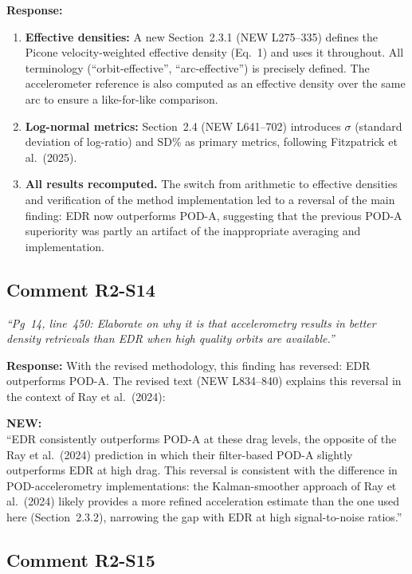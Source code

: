 \documentclass[11pt]{article}
\newcommand{\reviewercomment}[1]{%
  \medskip
  \noindent\textit{\color{reviewblue}#1}%
  \medskip
}
\newcommand{\newtext}[1]{%
  \smallskip
  \noindent\hspace{1em}\begin{minipage}{0.92\textwidth}%
  \color{quotegreen}\textbf{NEW:}\\[2pt]``#1''%
  \end{minipage}%
  \smallskip
}
\begin{document}
\textbf{Response:}

\begin{enumerate}[nosep]
  \item \textbf{Effective densities:} A new Section~2.3.1 (NEW L275--335) defines the Picone velocity-weighted effective density (Eq.~1) and uses it throughout. All terminology (``orbit-effective'', ``arc-effective'') is precisely defined. The accelerometer reference is also computed as an effective density over the same arc to ensure a like-for-like comparison.

  \item \textbf{Log-normal metrics:} Section~2.4 (NEW L641--702) introduces $\sigma$ (standard deviation of log-ratio) and SD\% as primary metrics, following Fitzpatrick et al.\ (2025).

  \item \textbf{All results recomputed.} The switch from arithmetic to effective densities and verification of the method implementation led to a reversal of the main finding: EDR now outperforms POD-A, suggesting that the previous POD-A superiority was partly an artifact of the inappropriate averaging and implementation.
\end{enumerate}


\subsection{Comment R2-S14}

\reviewercomment{%
``Pg~14, line~450: Elaborate on why it is that accelerometry results in better density retrievals than EDR when high quality orbits are available.''}

\textbf{Response:}
With the revised methodology, this finding has reversed: EDR outperforms POD-A. The revised text (NEW L834--840) explains this reversal in the context of Ray et al.\ (2024):

\newtext{EDR consistently outperforms POD-A at these drag levels, the opposite of the Ray et al.\ (2024) prediction in which their filter-based POD-A slightly outperforms EDR at high drag. This reversal is consistent with the difference in POD-accelerometry implementations: the Kalman-smoother approach of Ray et al.\ (2024) likely provides a more refined acceleration estimate than the one used here (Section~2.3.2), narrowing the gap with EDR at high signal-to-noise ratios.}


\subsection{Comment R2-S15}
\end{document}
